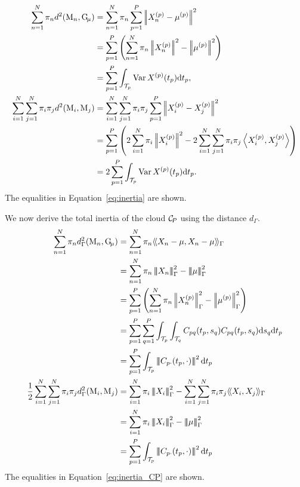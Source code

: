 \begin{align*}
    \sum_{n = 1}^N \pi_n d^2(\pobs{M}_n, \Gmu) 
    &= \sum_{n = 1}^N \pi_n \sum_{p = 1}^P\normLp{\Xnp - \mu^{(p)}}^2\\
    &= \sum_{p = 1}^P\left(\sum_{n = 1}^N \pi_n \normLp{\Xnp}^2 - \normLp{\mup{p}}^2\right) \\
    &= \sum_{p = 1}^P \int_{\TT{p}}\Var{\Xp{p}(t_p)} \dd t_p, \\
\sum_{i = 1}^N \sum_{j = 1}^N \pi_i \pi_j d^2(\pobs{M}_i, \pobs{M}_j) &= \sum_{i = 1}^N \sum_{j = 1}^N \pi_i \pi_j \sum_{p = 1}^P \normLp{\Xp{p}_i - \Xp{p}_j}^2\\
    &= \sum_{p = 1}^P \left(2\sum_{i = 1}^N \pi_i\normLp{\Xp{p}_i}^2 - 2\sum_{i = 1}^N \sum_{j = 1}^N \pi_i\pi_j\inLp{\Xp{p}_i}{\Xp{p}_j}\right) \\
    &= 2\sum_{p = 1}^P \int_{\TT{p}}\Var{\Xp{p}(t_p)} \dd t_p.
\end{align*}
The equalities in Equation~\eqref{eq:inertia} are shown.


We now derive the total inertia of the cloud $\mathcal{C}_{\!P}$ using the distance $d_\Gamma$.
\begin{align}
   \sum_{n = 1}^N \pi_n d_\Gamma^2(\pobs{M}_n, \Gmu) &= \sum_{n = 1}^N \pi_n \inHG{X_n - \mu}{X_n - \mu} \\
   &= \sum_{n = 1}^N \pi_n \normHG{X_n}^2 - \normHG{\mu}^2 \\
   &= \sum_{p = 1}^P \left(\sum_{n = 1}^N \pi_n \normLp{\Xnp}_{\Gamma}^2 - \normLp{\mup{p}}_{\Gamma}^2\right) \\
   &= \sum_{p = 1}^P \sum_{q = 1}^P \int_{\TT{p}} \int_{\TT{q}} C_{pq}(t_p, s_q)C_{pq}(t_p, s_q) \dd s_q \dd t_p \\
   &= \sum_{p = 1}^P \int_{\TT{p}} \normH{C_{p \cdot}(t_p, \cdot)}^2 \dd t_p \\
   \frac{1}{2}\sum_{i = 1}^N \sum_{j = 1}^N \pi_i \pi_j d_\Gamma^2(\pobs{M}_i, \pobs{M}_j)&= \sum_{i = 1}^N \pi_i \normHG{X_i}^2 - \sum_{i = 1}^N \sum_{j = 1}^N \pi_i\pi_j \inHG{X_i}{X_j} \\
    &= \sum_{i = 1}^N \pi_i \normHG{X_i}^2 - \normHG{\mu}^2 \\
    &= \sum_{p = 1}^P \int_{\TT{p}} \normH{C_{p \cdot}(t_p, \cdot)}^2 \dd t_p 
\end{align}
The equalities in Equation~\eqref{eq:inertia_CP} are shown.

